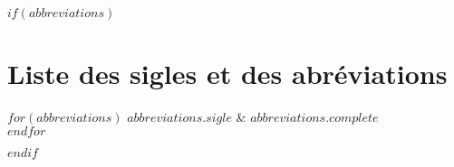 \documentclass[11pt,twoside,maitrise]{littfra}
\numberwithin{equation}{section}
\numberwithin{table}{chapter}
\numberwithin{figure}{chapter}
\begin{document}

\francais
\cleardoublepage
{}  %
\begin{spacing}{1.15}
\tableofcontents
\end{spacing}
\cleardoublepage
{}  %


$if(abbreviations)$

\chapter*{Liste des sigles et des abréviations}
\begin{twocolumnlist}{.2\textwidth}{.7\textwidth}
  $for(abbreviations)$
  $abbreviations.sigle$ & $abbreviations.complete$\\
  $endfor$
\end{twocolumnlist}
$endif$
\end{document}
